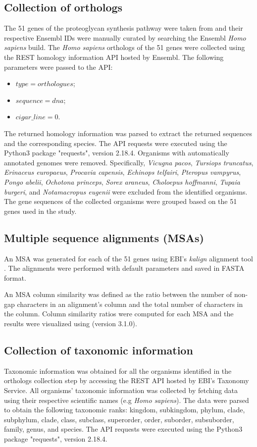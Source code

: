 \documentclass{article}
\begin{document}
\subsection{Collection of orthologs}
The 51 genes of the proteoglycan synthesis pathway were taken from \cite{pg_chapter} and their respective Ensembl IDs were manually curated by searching the Ensembl \textit{Homo sapiens} build. The \textit{Homo sapiens} orthologs of the 51 genes were collected using the REST homology information API hosted by Ensembl. The following parameters were passed to the API:
\begin{itemize}
	\item $type=orthologues$;
	\item $sequence=dna$;
	\item $cigar\_line=0$.
\end{itemize}
The returned homology information was parsed to extract the returned sequences and the corresponding species. The API requests were executed using the Python3 package "requests", version 2.18.4. Organisms with automatically annotated genomes were removed. Specifically, \textit{Vicugna pacos}, \textit{Tursiops truncatus}, \textit{Erinaceus europaeus}, \textit{Procavia capensis}, \textit{Echinops telfairi}, \textit{Pteropus vampyrus}, \textit{Pongo abelii}, \textit{Ochotona princeps}, \textit{Sorex araneus}, \textit{Choloepus hoffmanni}, \textit{Tupaia burgeri}, and \textit{Notamacropus eugenii} were excluded from the identified organisms. The gene sequences of the collected organisms were grouped based on the 51 genes used in the study. 

\subsection{Multiple sequence alignments (MSAs)}
An MSA was generated for each of the 51 genes using EBI's \textit{kalign} alignment tool \cite{kalign}. The alignments were performed with default parameters and saved in FASTA format.

An MSA column similarity was defined as the ratio between the number of non-gap characters in an alignment's column and the total number of characters in the column. Column similarity ratios were computed for each MSA and the results were visualized using \cite{matplotlib} (version 3.1.0).

\subsection{Collection of taxonomic information}
Taxonomic information was obtained for all the organisms identified in the orthologs collection step by accessing the REST API hosted by EBI's Taxonomy Service. All organisms' taxonomic information was collected by fetching data using their respective scientific names (e.g \textit{Homo sapiens}). The data were parsed to obtain the following taxonomic ranks: kingdom, subkingdom, phylum, clade, subphylum, clade, class, subclass, superorder, order, suborder, subsuborder, family, genus, and species. The API requests were executed using the Python3 package "requests", version 2.18.4.
\end{document}

